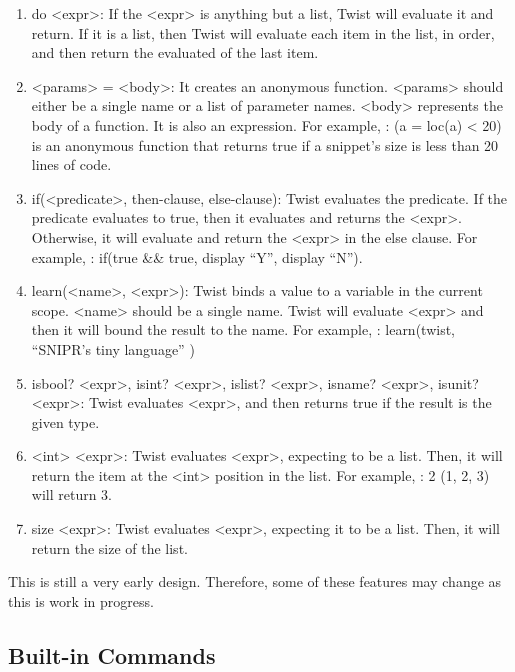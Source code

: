 \begin{enumerate}
	\item do <expr>: If the <expr> is anything but a list, Twist will evaluate it and 
	return. If it is a list, then Twist will evaluate each item in the list, in order, 
	and then return the evaluated of the last item.
	
	\item <params> = <body>: It creates an anonymous function. <params> should either be 
	a single name or a list of parameter names. <body> represents the body of a 
	function. It is also an expression. For example, : (a = loc(a) < 20) is an 
	anonymous function that returns true if a snippet's size is less than 20 lines of 
	code. 
	
	\item if(<predicate>, then-clause, else-clause): Twist evaluates the predicate. If 
	the predicate evaluates to true, then it evaluates and returns the <expr>. Otherwise, 
	it will evaluate and return the <expr> in the else clause. For example, : if(true 
	\&\& true, display ``Y'', display ``N'').
	
	\item learn(<name>, <expr>): Twist binds a value to a variable in the current scope. 
	<name> should be a single name. Twist will evaluate <expr> and then it will bound the 
	result to the name. For example, : learn(twist, ``SNIPR's tiny language'' )
   
	\item isbool? <expr>, isint? <expr>, islist? <expr>, isname? <expr>, isunit? <expr>: Twist 
	evaluates <expr>, and then returns true if the result is the given type.
 	
	\item <int> <expr>: Twist evaluates <expr>, expecting to be a list. Then, it will 
	return the item at the <int> position in the list. For example, : 2 (1, 2, 3) will 
	return 3.
	
	\item size <expr>: Twist evaluates <expr>, expecting it to be a list. Then, it will 
	return the size of the list.
\end{enumerate}

This is still a very early design. Therefore, some of these features may change as this 
is work in progress.

\subsection{Built-in Commands}
\label{sec:retargetingops}

